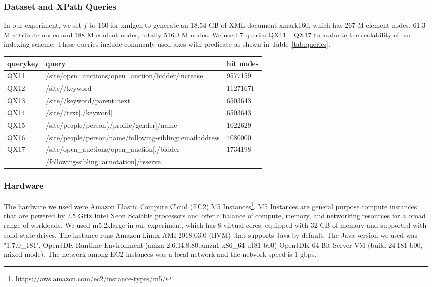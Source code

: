 \subsubsection{Dataset and XPath Queries} 

In our experiment, we set $f$ to 160 for xmlgen to generate an 18.54 GB of
XML document xmark160, which has 267 M element nodes, 61.3 M attribute nodes and
188 M content nodes, totally 516.3 M nodes. We used 7 queries QX11 -- QX17 to
evaluate the scalability of our indexing scheme. These queries include commonly
used axes with predicate as shown in Table~\ref{tab:queries}.


\begin{table*}[ht]
	\centering
	\caption{Queries used for xmark160 dataset.}
	\label{tab:queries}
	\begin{tabular}{|l|l|l|}
		\hline
		querykey & query                                                       & hit nodes \\ \hline
		QX11       & /site/open\_auctions/open\_auction/bidder/increase        & 9577159   \\ \hline
		QX12       & /site//keyword                                            & 11271671  \\ \hline
		QX13       & /site//keyword/parent::text                               & 6503643   \\ \hline
		QX14       & /site//text{[}./keyword{]}                                & 6503643   \\ \hline
		QX15       & /site/people/person{[}./profile/gender{]}/name            & 1022629   \\ \hline
		QX16       & /site/people/person/name/following-sibling::emailaddress  & 4080000   \\ \hline
		QX17       & /site/open\_auctions/open\_auction{[}./bidder             & 1734198   \\ 
		& /following-sibling::annotation{]}/reserve                 &           \\ \hline
	\end{tabular}
\end{table*}

\subsubsection{Hardware} 

The hardware we used were Amazon Elastic Compute Cloud (EC2) M5
Instances\footnote{\url{https://aws.amazon.com/ec2/instance-types/m5/}}. M5
Instances are general purpose compute instances that are powered by 2.5 GHz
Intel Xeon Scalable processors and offer a balance of compute, memory, and
networking resources for a broad range of workloads.  We used m5.2xlarge in our
experiment, which has 8 virtual cores, equipped with 32 GB of memory and
supported with solid state drives.  The instance runs Amazon Linux AMI 2018.03.0
(HVM) that supports Java by default. The Java version we used was "1.7.0\_181",
OpenJDK Runtime Environment (amzn-2.6.14.8.80.amzn1-x86\_64 u181-b00) OpenJDK
64-Bit Server VM (build 24.181-b00, mixed mode). The network among EC2 instances
was a local network and the network speed is 1 gbps.


